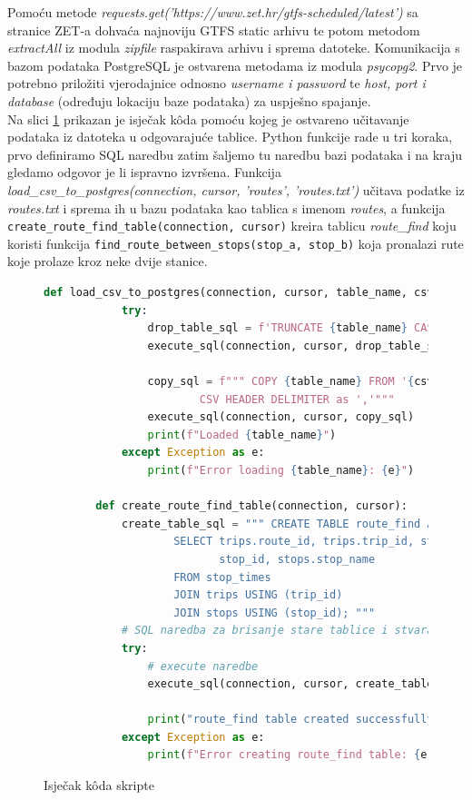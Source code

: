 \documentclass[zavrsnirad]{fer}
\begin{document}
Pomoću metode \textit{requests.get('https://www.zet.hr/gtfs-scheduled/latest')} sa stranice ZET-a dohvaća najnoviju GTFS static arhivu te potom metodom \textit{extractAll} iz modula \textit{zipfile} raspakirava arhivu i sprema datoteke. Komunikacija s bazom podataka PostgreSQL je ostvarena metodama iz modula \textit{psycopg2}. Prvo je potrebno priložiti vjerodajnice odnosno \textit{username i password} te \textit{host, port i database} (određuju lokaciju baze podataka) za uspješno spajanje.\\
Na slici \ref{slk:pytonskripta} prikazan je isječak k\^oda pomoću kojeg je ostvareno učitavanje podataka iz datoteka u odgovarajuće tablice. Python funkcije rade u tri koraka, prvo definiramo SQL naredbu zatim šaljemo tu naredbu bazi podataka i na kraju gledamo odgovor je li ispravno izvršena. Funkcija \textit{load\_csv\_to\_postgres(connection, cursor, 'routes', 'routes.txt')} učitava podatke iz \textit{routes.txt}  i sprema ih u bazu podataka kao tablica s imenom \textit{routes}, a funkcija \texttt{create\_route\_find\_table(connection, cursor)} kreira tablicu \textit{route\_find} koju koristi funkcija \texttt{find\_route\_between\_stops(stop\_a, stop\_b)} koja pronalazi rute koje prolaze kroz neke dvije stanice.

\begin{figure}[H]
	\centering
	\begin{minipage}{0.9\linewidth}
		\begin{lstlisting}[language=Python]
		def load_csv_to_postgres(connection, cursor, table_name, csv_file_path):
			try:
				drop_table_sql = f'TRUNCATE {table_name} CASCADE;'
				execute_sql(connection, cursor, drop_table_sql)

				copy_sql = f""" COPY {table_name} FROM '{csv_file_path}' WITH
						CSV HEADER DELIMITER as ','"""
				execute_sql(connection, cursor, copy_sql)
				print(f"Loaded {table_name}")
			except Exception as e:
				print(f"Error loading {table_name}: {e}")

		def create_route_find_table(connection, cursor):
			create_table_sql = """ CREATE TABLE route_find AS
					SELECT trips.route_id, trips.trip_id, stop_times.stop_sequence,
						   stop_id, stops.stop_name
					FROM stop_times
					JOIN trips USING (trip_id)
					JOIN stops USING (stop_id); """
			# SQL naredba za brisanje stare tablice i stvaranje indeksa
			try:
				# execute naredbe
				execute_sql(connection, cursor, create_table_sql)

				print("route_find table created successfully.")
			except Exception as e:
				print(f"Error creating route_find table: {e}")
		\end{lstlisting}
	\end{minipage}
	\caption{Isječak k\^oda skripte}
	\label{slk:pytonskripta}
\end{figure}
\end{document}
